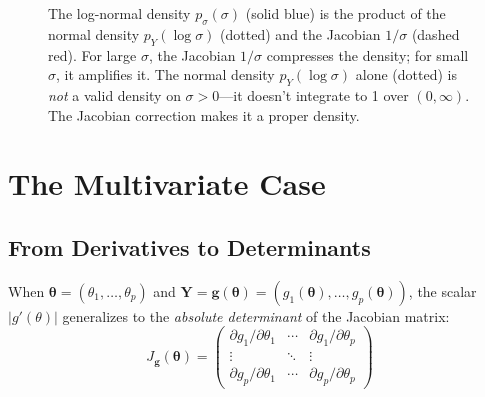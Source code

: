 \documentclass[11pt,a4paper]{article}
\theoremstyle{definition}
\newcommand{\btheta}{\boldsymbol{\theta}}
\begin{document}
\begin{figure}[ht]
\centering
{}
\caption{%
    The log-normal density $p_\sigma(\sigma)$ (solid blue) is the product of
    the normal density $p_Y(\log\sigma)$ (dotted) and the Jacobian
    $1/\sigma$ (dashed red). For large $\sigma$, the Jacobian $1/\sigma$
    compresses the density; for small $\sigma$, it amplifies it. The normal
    density $p_Y(\log\sigma)$ alone (dotted) is \emph{not} a valid density on
    $\sigma > 0$---it doesn't integrate to 1 over $(0, \infty)$. The Jacobian
    correction makes it a proper density.
}
\label{fig:lognormal}
\end{figure}


\section{The Multivariate Case}
\label{sec:multivariate}

\subsection{From Derivatives to Determinants}

When $\btheta = (\theta_1, \ldots, \theta_p)$ and
$\mathbf{Y} = \mathbf{g}(\btheta) = (g_1(\btheta), \ldots, g_p(\btheta))$,
the scalar $|g'(\theta)|$ generalizes to the \emph{absolute determinant} of
the Jacobian matrix:
\begin{equation}
    J_{\mathbf{g}}(\btheta) =
    \begin{pmatrix}
        \partial g_1/\partial\theta_1 & \cdots & \partial g_1/\partial\theta_p \\
        \vdots & \ddots & \vdots \\
        \partial g_p/\partial\theta_1 & \cdots & \partial g_p/\partial\theta_p
    \end{pmatrix}
\end{equation}
\end{document}
